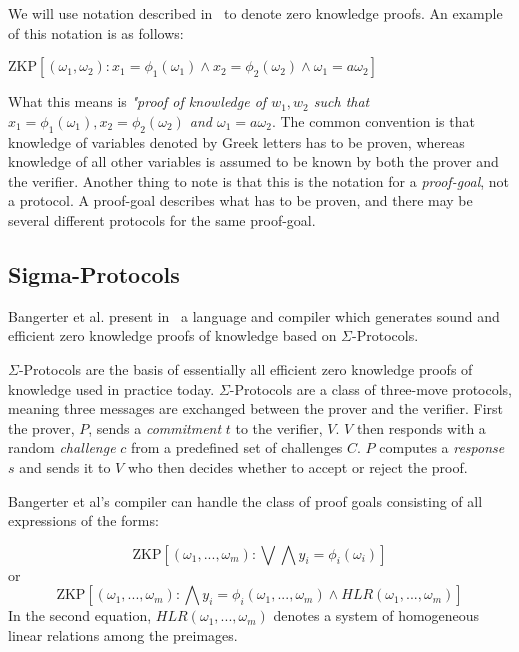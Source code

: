 \documentclass{sig-alternate}
\begin{document}
	We will use notation described in~\cite{Sigma:2009} to denote zero knowledge
	proofs. An example of this notation is as follows:
	
	\begin{center}
		$\text{ZKP}[(\omega_{1},\omega_{2}):x_{1} = \phi_{1}(\omega_{1}) \land  x_{2} = \phi_{2}(\omega_{2}) \land \omega_{1} = a\omega_{2}]$ 
	\end{center}
	
	What this means is \textit{"proof of knowledge of $w_{1}, w_{2}$ such that 
	$x_{1} = \phi_{1}(\omega_{1}), x_{2} = \phi_{2}(\omega_{2})$ and $\omega_{1} = a\omega_{2}$}.
	The common convention is that knowledge of variables denoted by Greek
	letters has to be proven, whereas knowledge of all other variables is
	assumed to be known by both the prover and the verifier. Another thing
	to note is that this is the notation for a \textit{proof-goal}, not
	a protocol. A proof-goal describes what has to be proven, and there may
	be several different protocols for the same proof-goal.

	\subsection{Sigma-Protocols}
		Bangerter et al. present in~\cite{Sigma:2009} a language and compiler
		which generates sound and efficient zero knowledge proofs of knowledge
		based on $\Sigma$-Protocols.	
	
		$\Sigma$-Protocols are the basis of essentially all efficient zero knowledge
		proofs of knowledge used in practice today. $\Sigma$-Protocols are a class of
		three-move protocols, meaning three messages are exchanged between the prover
		and the verifier. First the prover, $P$, sends a \textit{commitment} $t$ to the
		verifier, $V$. $V$ then responds with a random \textit{challenge} $c$ from a 
		predefined set of challenges $C$. $P$ computes a \textit{response} $s$ and sends
		it to $V$ who then decides whether to accept or reject the proof.
		
		Bangerter et al's compiler can handle the class of proof goals consisting of
		all expressions of the forms:
		
		\begin{equation*}
		\text{ZKP}[(\omega_{1},...,\omega_{m}):\bigvee\bigwedge y_{i} = \phi_{i}(\omega_{i})]
		\end{equation*}
		or
		\begin{equation*}
		\text{ZKP}[(\omega_{1},...,\omega_{m}):\bigwedge y_{i} = \phi_{i}(\omega_{1},...,\omega_{m})\land HLR(\omega_{1},...,\omega_{m})]
		\end{equation*}
		In the second equation, $HLR(\omega_{1},...,\omega_{m})$ denotes a system of 
		homogeneous linear relations among the preimages.
		
\end{document}
